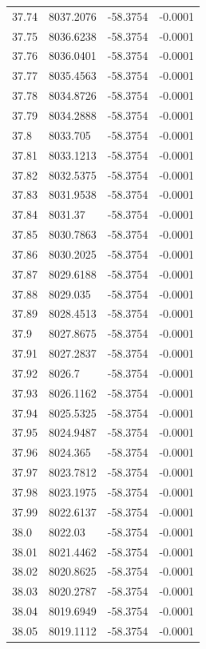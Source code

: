 \begin{table}[H]
\begin{tabular}{llll}
37.74 & 8037.2076 & -58.3754 & -0.0001 \\
37.75 & 8036.6238 & -58.3754 & -0.0001 \\
37.76 & 8036.0401 & -58.3754 & -0.0001 \\
37.77 & 8035.4563 & -58.3754 & -0.0001 \\
37.78 & 8034.8726 & -58.3754 & -0.0001 \\
37.79 & 8034.2888 & -58.3754 & -0.0001 \\
37.8 & 8033.705 & -58.3754 & -0.0001 \\
37.81 & 8033.1213 & -58.3754 & -0.0001 \\
37.82 & 8032.5375 & -58.3754 & -0.0001 \\
37.83 & 8031.9538 & -58.3754 & -0.0001 \\
37.84 & 8031.37 & -58.3754 & -0.0001 \\
37.85 & 8030.7863 & -58.3754 & -0.0001 \\
37.86 & 8030.2025 & -58.3754 & -0.0001 \\
37.87 & 8029.6188 & -58.3754 & -0.0001 \\
37.88 & 8029.035 & -58.3754 & -0.0001 \\
37.89 & 8028.4513 & -58.3754 & -0.0001 \\
37.9 & 8027.8675 & -58.3754 & -0.0001 \\
37.91 & 8027.2837 & -58.3754 & -0.0001 \\
37.92 & 8026.7 & -58.3754 & -0.0001 \\
37.93 & 8026.1162 & -58.3754 & -0.0001 \\
37.94 & 8025.5325 & -58.3754 & -0.0001 \\
37.95 & 8024.9487 & -58.3754 & -0.0001 \\
37.96 & 8024.365 & -58.3754 & -0.0001 \\
37.97 & 8023.7812 & -58.3754 & -0.0001 \\
37.98 & 8023.1975 & -58.3754 & -0.0001 \\
37.99 & 8022.6137 & -58.3754 & -0.0001 \\
38.0 & 8022.03 & -58.3754 & -0.0001 \\
38.01 & 8021.4462 & -58.3754 & -0.0001 \\
38.02 & 8020.8625 & -58.3754 & -0.0001 \\
38.03 & 8020.2787 & -58.3754 & -0.0001 \\
38.04 & 8019.6949 & -58.3754 & -0.0001 \\
38.05 & 8019.1112 & -58.3754 & -0.0001 \\

\end{tabular}
\end{table}
